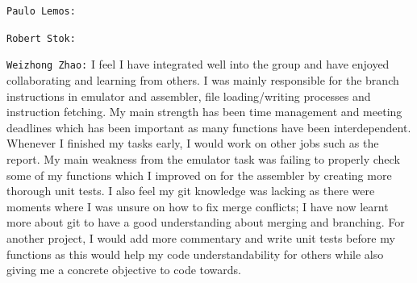 \documentclass[11pt]{article}
\begin{document}
\texttt{Paulo Lemos:} 

\texttt{Robert Stok:} 

\texttt{Weizhong Zhao:} I feel I have integrated well into the group and have enjoyed collaborating and learning from others. I was mainly responsible for the branch instructions in emulator and assembler, file loading/writing processes and instruction fetching. My main strength has been time management and meeting deadlines which has been important as many functions have been interdependent. Whenever I finished my tasks early, I would work on other jobs such as the report. My main weakness from the emulator task was failing to properly check some of my functions which I improved on for the assembler by creating more thorough unit tests. I also feel my git knowledge was lacking as there were moments where I was unsure on how to fix merge conflicts; I have now learnt more about git to have a good understanding about merging and branching. For another project, I would add more commentary and write unit tests before my functions as this would help my code understandability for others while also giving me a concrete objective to code towards.
\end{document}
